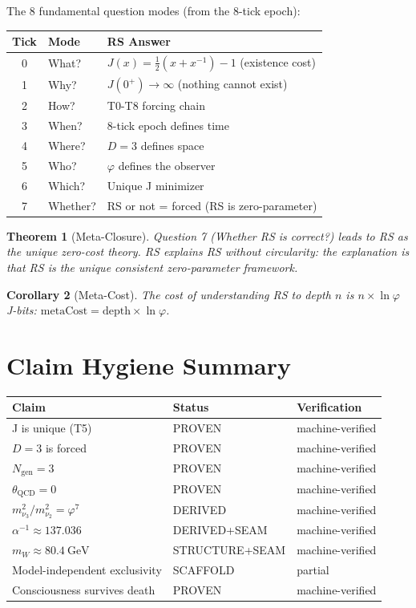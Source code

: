 \documentclass[12pt,a4paper]{article}
\newtheorem{theorem}{Theorem}[section]
\newtheorem{corollary}[theorem]{Corollary}
\theoremstyle{definition}
\theoremstyle{remark}
\begin{document}
The 8 fundamental question modes (from the 8-tick epoch):
\begin{center}
\begin{tabular}{cll}
\hline
Tick & Mode & RS Answer \\
\hline
0 & What? & $J(x) = \frac{1}{2}(x+x^{-1})-1$ (existence cost) \\
1 & Why? & $J(0^+) \to \infty$ (nothing cannot exist) \\
2 & How? & T0-T8 forcing chain \\
3 & When? & 8-tick epoch defines time \\
4 & Where? & $D = 3$ defines space \\
5 & Who? & $\varphi$ defines the observer \\
6 & Which? & Unique J minimizer \\
7 & Whether? & RS or not = forced (RS is zero-parameter) \\
\hline
\end{tabular}
\end{center}

\begin{theorem}[Meta-Closure]
Question 7 (Whether RS is correct?) leads to RS as the 
unique zero-cost theory. RS explains RS without circularity: the explanation 
is that RS is the unique consistent zero-parameter framework.
\end{theorem}

\begin{corollary}[Meta-Cost]
The cost of understanding RS to depth $n$ is $n \times \ln\varphi$ J-bits:
$\mathrm{metaCost} = \mathrm{depth} \times \ln\varphi$.
\end{corollary}

\section{Claim Hygiene Summary}

\begin{center}
\begin{tabular}{p{6cm}p{3cm}p{4cm}}
\hline
\textbf{Claim} & \textbf{Status} & \textbf{Verification} \\
\hline
J is unique (T5) & PROVEN & machine-verified \\
$D = 3$ is forced & PROVEN & machine-verified \\
$N_\mathrm{gen} = 3$ & PROVEN & machine-verified \\
$\theta_\mathrm{QCD} = 0$ & PROVEN & machine-verified \\
$m_{\nu_3}^2/m_{\nu_2}^2 = \varphi^7$ & DERIVED & machine-verified \\
$\alpha^{-1} \approx 137.036$ & DERIVED+SEAM & machine-verified \\
$m_W \approx 80.4~\text{GeV}$ & STRUCTURE+SEAM & machine-verified \\
Model-independent exclusivity & SCAFFOLD & partial \\
Consciousness survives death & PROVEN & machine-verified \\
\hline
\end{tabular}
\end{center}
\end{document}

